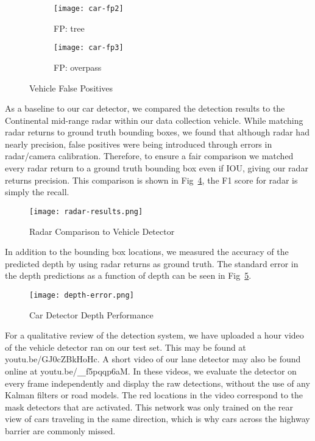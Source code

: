 \documentclass[journal]{IEEEtran}
\begin{document}
\begin{figure}[tb]
        \centering
        \begin{subfigure}[b]{1.7in}\texttt{[image: car-fp2]}
                \caption{FP: tree}
                \label{fig:car-tree}
        \end{subfigure}\begin{subfigure}[b]{1.7in}
                \texttt{[image: car-fp3]}
                \caption{FP: overpass}
                \label{fig:car-overpass}
        \end{subfigure}
        \caption{Vehicle False Positives}\label{fig:car-fp}
\end{figure}

As a baseline to our car detector, we compared the detection results to the Continental mid-range radar within our data collection vehicle. While matching radar returns to ground truth bounding boxes, we found that although radar had nearly  precision, false positives were being introduced through errors in radar/camera calibration. Therefore, to ensure a fair comparison we matched every radar return to a ground truth bounding box even if IOU, giving our radar returns  precision. This comparison is shown in Fig~\ref{fig:nn-v-radar}, the F1 score for radar is simply the recall.

\begin{figure}[tb]
  \centering
    \texttt{[image: radar-results.png]}
 \caption{Radar Comparison to Vehicle Detector}
 \label{fig:nn-v-radar}
\end{figure}


In addition to the bounding box locations, we measured the accuracy of the predicted depth by using radar returns as ground truth. The standard error in the depth predictions as a function of depth can be seen in Fig~\ref{fig:car-depth-error}.

\begin{figure}[tb]
  \centering
\texttt{[image: depth-error.png]}
 \caption{Car Detector Depth Performance}
 \label{fig:car-depth-error}
\end{figure}


For a qualitative review of the detection system, we have uploaded a  hour video of the vehicle detector ran on our test set. This may be found at youtu.be/GJ0cZBkHoHc. A short video of our lane detector may also be found online at youtu.be/\texttt{\_\_}f5pqqp6aM. In these videos, we evaluate the detector on every frame independently and display the raw detections, without the use of any Kalman filters or road models. The red locations in the video correspond to the mask detectors that are activated. This network was only trained on the rear view of cars traveling in the same direction, which is why cars across the highway barrier are commonly missed.
\end{document}
